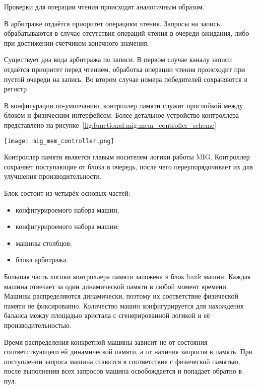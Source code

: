Проверки для операции чтения происходят аналогичным образом.

В арбитраже  отдаётся приоритет операциям чтения. Запросы на запись
обрабатываются в случае отсутствия операций чтения в очереди ожидания, либо при достижении
счётчиком  конечного значения.

Существует два вида арбитража по записи. В первом случае каналу записи отдаётся приоритет перед чтением,
обработка операции чтения происходит при пустой очереди на запись. Во втором случае номера победителей
сохраняются в регистр .

В конфигурации по-умолчанию, контроллер памяти служит прослойкой между блоком  и физическим
интерфейсом. Более детальное устройство контроллера представлено на рисунке~\ref{fig:functional:mig:mem_controller_scheme}

\begin{center}
  \centering
  \texttt{[image: mig\_mem\_controller.png]}
  \label{fig:functional:mig:mem_controller_scheme}
\end{center}

Контроллер памяти является главым носителем логики работы MIG. Контроллер сохраняет поступающие от блока 
в очередь, после чего переупорядочивает их для улучшения производительности.

Блок состоит из четырёх основых частей:
\begin{itemize}
  \item конфигурироемого набора  машин;
  \item конфигурироемого набора  машин;
  \item машины столбцов;
  \item блока арбитража.
\end{itemize}

Большая часть логики контроллера памяти заложена в блок bank машин. Каждая  машина
отвечает за один  динамической памяти в любой момент времени. Машины распределяются
динамически, поэтому их соответствие физической памяти не фиксированно. Количество машин
конфигурируется для нахождения баланса между площадью кристала с сгенерированной логикой и
её производительностью.

Время распределения конкретной машины зависит не от состояния соответствующего ей 
динамической памяти, а от наличия запросов в память. При поступлении запроса машина
ставится в соответствие с физической памятью, после выполнения всех запросов машина
освобождается и попадает обратно в пул.

